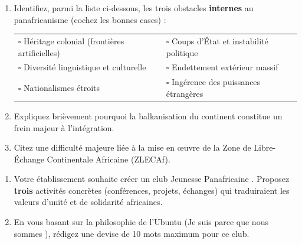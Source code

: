 \documentclass[11pt]{article}
\begin{document}
\begin{exercice}
\begin{enumerate}
    \item Identifiez, parmi la liste ci-dessous, les trois obstacles \textbf{internes} au panafricanisme (cochez les bonnes cases) :
\begin{tabular}{ll}
        $\square$ Héritage colonial (frontières artificielles) & $\square$ Coups d'État et instabilité politique \\
        $\square$ Diversité linguistique et culturelle & $\square$ Endettement extérieur massif \\
        $\square$ Nationalismes étroits & $\square$ Ingérence des puissances étrangères
    \end{tabular}
    \item Expliquez brièvement pourquoi la \og balkanisation \fg du continent constitue un frein majeur à l'intégration.
    \item Citez une difficulté majeure liée à la mise en œuvre de la Zone de Libre-Échange Continentale Africaine (ZLECAf).
\end{enumerate}
\end{exercice}

\begin{exercice}
\begin{enumerate}
    \item Votre établissement souhaite créer un club \og Jeunesse Panafricaine \fg. Proposez \textbf{trois} activités concrètes (conférences, projets, échanges) qui traduiraient les valeurs d'unité et de solidarité africaines.
    \item En vous basant sur la philosophie de l'\og Ubuntu \fg (\og Je suis parce que nous sommes \fg), rédigez une devise de 10 mots maximum pour ce club.
\end{enumerate}
\end{exercice}
\end{document}
